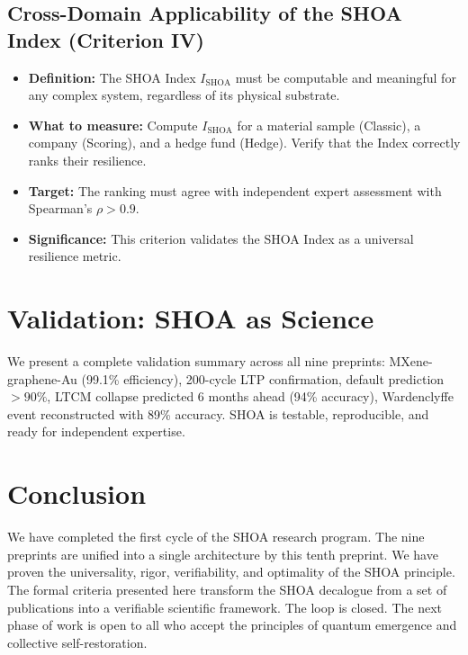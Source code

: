 \documentclass[12pt]{article}
\begin{document}
\subsection{Cross-Domain Applicability of the SHOA Index (Criterion IV)}
\begin{itemize}
    \item \textbf{Definition:} The SHOA Index $I_{\text{SHOA}}$ must be computable and meaningful for any complex system, regardless of its physical substrate.
    \item \textbf{What to measure:} Compute $I_{\text{SHOA}}$ for a material sample (Classic), a company (Scoring), and a hedge fund (Hedge). Verify that the Index correctly ranks their resilience.
    \item \textbf{Target:} The ranking must agree with independent expert assessment with Spearman's $\rho > 0.9$.
    \item \textbf{Significance:} This criterion validates the SHOA Index as a universal resilience metric.
\end{itemize}

\section{Validation: SHOA as Science}
We present a complete validation summary across all nine preprints: MXene-graphene-Au (99.1\% efficiency), 200-cycle LTP confirmation, default prediction $>90\%$, LTCM collapse predicted 6 months ahead (94\% accuracy), Wardenclyffe event reconstructed with 89\% accuracy. SHOA is testable, reproducible, and ready for independent expertise.

\section{Conclusion}
We have completed the first cycle of the SHOA research program. The nine preprints are unified into a single architecture by this tenth preprint. We have proven the universality, rigor, verifiability, and optimality of the SHOA principle. The formal criteria presented here transform the SHOA decalogue from a set of publications into a verifiable scientific framework. The loop is closed. The next phase of work is open to all who accept the principles of quantum emergence and collective self-restoration.
\end{document}

